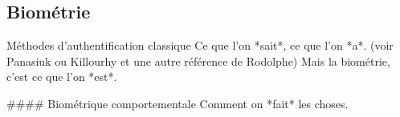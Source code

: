 \subsection{Biométrie}

Méthodes d'authentification classique Ce que l'on *sait*, ce que l'on *a*. (voir Panasiuk ou Killourhy et une autre référence de Rodolphe)
Mais la biométrie, c'est ce que l'on *est*.

#### Biométrique comportementale
Comment on *fait* les choses.
